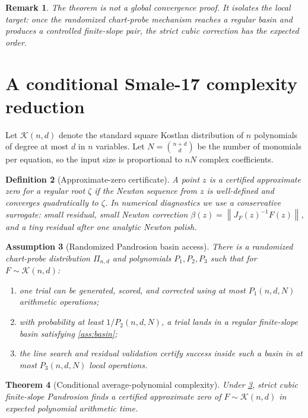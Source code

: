 \documentclass[11pt]{article}
\newtheorem{definition}{Definition}[section]
\newtheorem{assumption}[definition]{Assumption}
\newtheorem{theorem}[definition]{Theorem}
\newtheorem{remark}[definition]{Remark}
\newcommand{\K}{\mathcal K}
\newcommand{\norm}[1]{\left\lVert #1\right\rVert}
\begin{document}
\begin{remark}
The theorem is not a global convergence proof.  It isolates the local target: once the randomized chart-probe mechanism reaches a regular basin and produces a controlled finite-slope pair, the strict cubic correction has the expected order.
\end{remark}

\section{A conditional Smale-17 complexity reduction}

Let $\K(n,d)$ denote the standard square Kostlan distribution of $n$ polynomials of degree at most $d$ in $n$ variables.  Let $N=\binom{n+d}{d}$ be the number of monomials per equation, so the input size is proportional to $nN$ complex coefficients.

\begin{definition}[Approximate-zero certificate]
A point $z$ is a certified approximate zero for a regular root $\zeta$ if the Newton sequence from $z$ is well-defined and converges quadratically to $\zeta$.  In numerical diagnostics we use a conservative surrogate: small residual, small Newton correction $\beta(z)=\norm{J_F(z)^{-1}F(z)}$, and a tiny residual after one analytic Newton polish.
\end{definition}

\begin{assumption}[Randomized Pandrosion basin access]\label{ass:access}
There is a randomized chart-probe distribution $\Pi_{n,d}$ and polynomials $P_1,P_2,P_3$ such that for $F\sim\K(n,d)$:
\begin{enumerate}[label=(\roman*)]
\item one trial can be generated, scored, and corrected using at most $P_1(n,d,N)$ arithmetic operations;
\item with probability at least $1/P_2(n,d,N)$, a trial lands in a regular finite-slope basin satisfying \cref{ass:basin};
\item the line search and residual validation certify success inside such a basin in at most $P_3(n,d,N)$ local operations.
\end{enumerate}
\end{assumption}

\begin{theorem}[Conditional average-polynomial complexity]\label{thm:conditional-smale}
Under \cref{ass:access}, strict cubic finite-slope Pandrosion finds a certified approximate zero of $F\sim\K(n,d)$ in expected polynomial arithmetic time.
\end{theorem}
\end{document}
